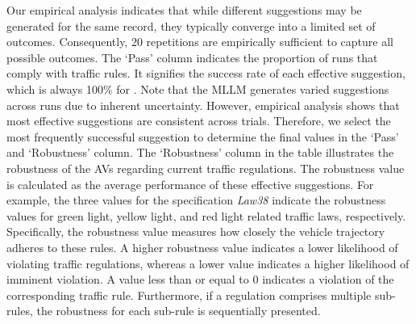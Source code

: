 Our empirical analysis indicates that while different suggestions may be generated for the same record, they typically converge into a limited set of outcomes. Consequently, 20 repetitions are empirically sufficient to capture all possible outcomes.
The `Pass' column indicates the proportion of runs that comply with traffic rules.
It signifies the success rate of each effective suggestion, which is always 100\% for \coolname.
Note that the MLLM generates varied suggestions across runs due to inherent uncertainty. 
However, empirical analysis shows that most effective suggestions are consistent across trials. Therefore, we select the most frequently successful suggestion to determine the final values in the `Pass' and `Robustness' column.
The `Robustness' column in the table illustrates the robustness of the AVs regarding current traffic regulations. The robustness value is calculated as the average performance of these effective suggestions. 
For example, the three values for the specification \emph{Law38} indicate the robustness values for green light, yellow light, and red light related traffic laws, respectively.
Specifically, the robustness value measures how closely the vehicle trajectory adheres to these rules. A higher robustness value indicates a lower likelihood of violating traffic regulations, whereas a lower value indicates a higher likelihood of imminent violation. A value less than or equal to $0$ indicates a violation of the corresponding traffic rule.
Furthermore, if a regulation comprises multiple sub-rules, the robustness for each sub-rule is sequentially presented.



